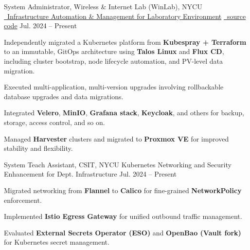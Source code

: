 
\begin{cventries}

    
  \cventry
  {System Administrator, Wireless \& Internet Lab (WinLab), NYCU} %
  {\href{https://github.com/ChesterChuTw/winfra-cluster-management}
  {\faGithub\ Infrastructure Automation \& Management for Laboratory Environment}}
  {\href{https://github.com/ChesterChuTw/winfra-cluster-management}{\faGithub\ source code}} %
  {Jul. 2024 -- Present} %
  {
    \begin{cvitems}
      \item {Independently migrated a Kubernetes platform from \textbf{Kubespray + Terraform} to an immutable, GitOps architecture using \textbf{Talos Linux} and \textbf{Flux CD}, including cluster bootstrap, node lifecycle automation, and PV-level data migration.}
      \item {Executed multi-application, multi-version upgrades involving rollbackable database upgrades and data migrations.}
      \item {Integrated \textbf{Velero}, \textbf{MinIO}, \textbf{Grafana stack}, \textbf{Keycloak}, and others for backup, storage, access control, and so on.}
      \item {Managed \textbf{Harvester} clusters and migrated to \textbf{Proxmox VE} for improved stability and flexibility.}
    \end{cvitems}
  }
  \cventry
  {System Teach Assistant, CSIT, NYCU} %
  {Kubernetes Networking and Security Enhancement for Dept. Infrastructure} %
  {} %
  {Jul. 2024 -- Present} %
  {
    \begin{cvitems}
      \item {Migrated networking from \textbf{Flannel} to \textbf{Calico} for fine-grained \textbf{NetworkPolicy} enforcement.}
      \item {Implemented \textbf{Istio Egress Gateway} for unified outbound traffic management.}
      \item {Evaluated \textbf{External Secrets Operator (ESO)} and \textbf{OpenBao (Vault fork)} for Kubernetes secret management.}

\end{cvitems}}
\end{cventries}
